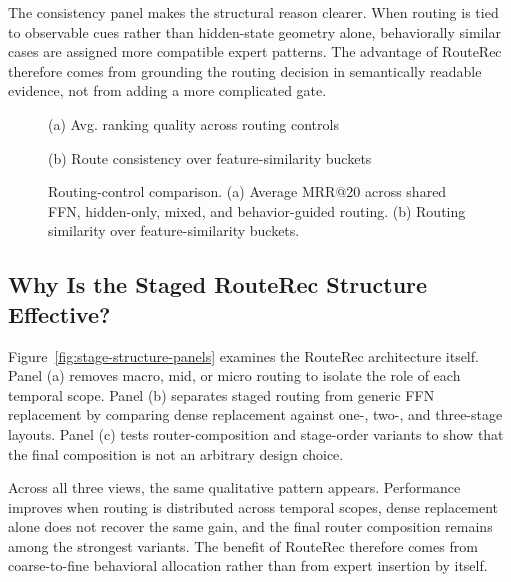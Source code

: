 \documentclass[sigconf,review,anonymous]{acmart}
\newcommand{\placeholderpanel}[1]{\fbox{\rule{0pt}{#1}\rule{0.92\linewidth}{0pt}}}
\begin{document}
The consistency panel makes the structural reason clearer. When routing is tied to observable cues rather than hidden-state geometry alone, behaviorally similar cases are assigned more compatible expert patterns. The advantage of RouteRec therefore comes from grounding the routing decision in semantically readable evidence, not from adding a more complicated gate.

\begin{figure}[!t]
  \centering
  \begin{minipage}[t]{0.48\columnwidth}
    \centering
    \placeholderpanel{1.25in}

    \vspace{0.35em}
    {\footnotesize (a) Avg. ranking quality across routing controls}
  \end{minipage}\hfill
  \begin{minipage}[t]{0.48\columnwidth}
    \centering
    \placeholderpanel{1.25in}

    \vspace{0.35em}
    {\footnotesize (b) Route consistency over feature-similarity buckets}
  \end{minipage}
  \caption{Routing-control comparison. (a) Average MRR@20 across shared FFN, hidden-only, mixed, and behavior-guided routing. (b) Routing similarity over feature-similarity buckets.}
  \label{fig:routing-control-panels}
\end{figure}

\subsection{Why Is the Staged RouteRec Structure Effective?}
\label{sec:stage-structure}
Figure~\ref{fig:stage-structure-panels} examines the RouteRec architecture itself. Panel (a) removes macro, mid, or micro routing to isolate the role of each temporal scope. Panel (b) separates staged routing from generic FFN replacement by comparing dense replacement against one-, two-, and three-stage layouts. Panel (c) tests router-composition and stage-order variants to show that the final composition is not an arbitrary design choice.

Across all three views, the same qualitative pattern appears. Performance improves when routing is distributed across temporal scopes, dense replacement alone does not recover the same gain, and the final router composition remains among the strongest variants. The benefit of RouteRec therefore comes from coarse-to-fine behavioral allocation rather than from expert insertion by itself.
\end{document}
